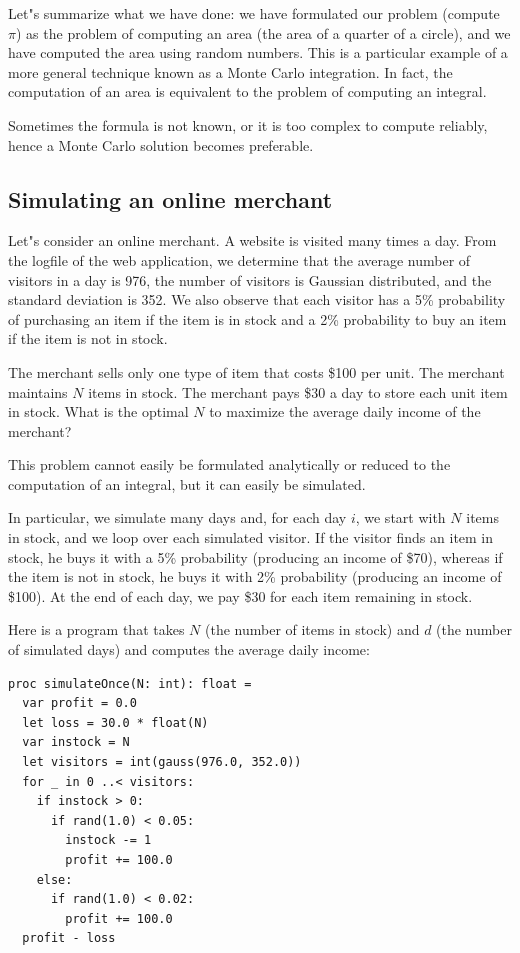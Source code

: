 \documentclass[justified, sixbynine]{tufte-book}
\theoremstyle{plain}%
\newtheorem * {corollary}{Corollary}
\theoremstyle{definition}
\theoremstyle{remark}
\newtheorem * {remark}{Remark}
\newtheorem * {note}{Note}
\begin{document}
\begin{fullwidth}
Let"s summarize what we have done: we have formulated our problem (compute $%
\pi $) as the problem of computing an area (the area of a quarter of a
circle), and we have computed the area using random numbers. This is a
particular example of a more general technique known as a Monte Carlo
integration. In fact, the computation of an area is equivalent to the problem
of computing an integral.

Sometimes the formula is not known, or it is too complex to compute reliably, hence a Monte Carlo solution becomes preferable.


\goodbreak\subsection{Simulating an online merchant}

Let"s consider an online merchant. A website is visited many times a day.
From the logfile of the web application, we determine
that the average number of visitors in a day is 976, the number of
visitors is Gaussian distributed, and the standard deviation is 352. We also observe that each visitor has a 5\% probability of purchasing an item
if the item is in stock and a 2\% probability to buy an item if the
item is not in stock.

The merchant sells only one type of item that costs \$100 per unit. The
merchant maintains $N$ items in stock. The merchant pays \$30 a day to store
each unit item in stock. What is the optimal $N$ to maximize the average
daily income of the merchant?

This problem cannot easily be formulated analytically or reduced to
the computation of an integral, but it can easily be simulated.

In particular, we simulate many days and, for each day $i$, 
we start with $N$ items
in stock, and we loop over each simulated visitor. If the visitor
finds an item in stock, he buys it with a 5\% probability
(producing an income of \$70), whereas if the item is not in stock, 
 he buys it with 2\% probability (producing an income of \$100).
At the end of each day, we pay \$30 for each item remaining in stock.

Here is a program that takes $N$ (the number of items in stock) and $d$ (the
number of simulated days) and computes the average daily income:
\begin{lstlisting}
proc simulateOnce(N: int): float =
  var profit = 0.0
  let loss = 30.0 * float(N)
  var instock = N
  let visitors = int(gauss(976.0, 352.0))
  for _ in 0 ..< visitors:
    if instock > 0:
      if rand(1.0) < 0.05:
        instock -= 1
        profit += 100.0
    else:
      if rand(1.0) < 0.02:
        profit += 100.0
  profit - loss


\end{lstlisting}
\end{fullwidth}
\end{document}
